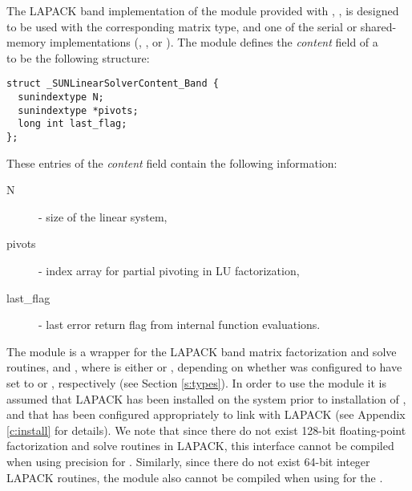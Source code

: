 
The LAPACK band implementation of the {\sunlinsol} module provided
with {\sundials}, {\sunlinsollapband}, is designed to be used with the
corresponding {\sunmatband} matrix type, and one of the serial or
shared-memory {\nvector} implementations ({\nvecs}, {\nvecopenmp}, or
{\nvecpthreads}).  The {\sunlinsollapband} module defines the {\em
content} field of a\\
\noindent{} to be the following structure:
\begin{verbatim} 
struct _SUNLinearSolverContent_Band {
  sunindextype N;
  sunindextype *pivots;
  long int last_flag;
};
\end{verbatim}
These entries of the \emph{content} field contain the following
information:
\begin{description}
  \item[N] - size of the linear system,
  \item[pivots] - index array for partial pivoting in LU factorization,
  \item[last\_flag] - last error return flag from internal function evaluations.
\end{description}

{\warn} The {\sunlinsollapband} module is a {\sunlinsol} wrapper for
the LAPACK band matrix factorization and solve routines, 
and , where \id{*} is either  or , depending on
whether {\sundials} was configured to have  set to
 or , respectively (see Section \ref{s:types}).
In order to use the {\sunlinsollapband} module it is assumed
that LAPACK has been installed on the system prior to installation of
{\sundials}, and that {\sundials} has been configured appropriately to
link with LAPACK (see Appendix \ref{c:install} for details).  We note
that since there do not exist 128-bit floating-point factorization and
solve routines in LAPACK, this interface cannot be compiled when
using  precision for .  Similarly, since
there do not exist 64-bit integer LAPACK routines, the
{\sunlinsollapband} module also cannot be compiled when using 
 for the .

